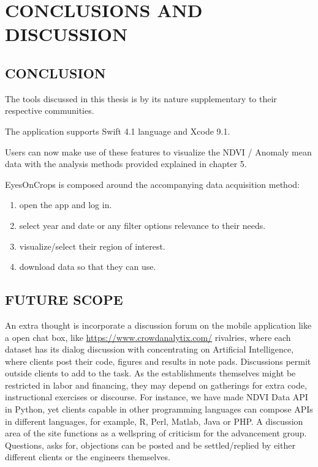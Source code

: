 \chapter{CONCLUSIONS AND DISCUSSION}
\label{chap:conclusion}

\section{CONCLUSION}



The tools discussed in this thesis is by its nature supplementary to their respective communities.

The application supports Swift 4.1 language and Xcode 9.1.

Users can now make use of these features to visualize the NDVI / Anomaly mean data with the analysis methods provided explained in chapter 5. 

EyesOnCrops is composed around the accompanying data acquisition method:
\begin{enumerate}
  \item open the app and log in. 
  \item select year and date or any filter options relevance to their needs.
  \item visualize/select their region of interest.
  \item download data so that they can use.
\end{enumerate}

\section{FUTURE SCOPE}

An extra thought is incorporate a discussion forum on the mobile application like a open chat box, like \url{https://www.crowdanalytix.com/} rivalries, where each dataset has its dialog discussion with concentrating on Artificial Intelligence, where clients post their code, figures and results in note pads. Discussions permit outside clients to add to the task. As the establishments themselves might be restricted in labor and financing, they may depend on gatherings for extra code, instructional exercises or discourse. For instance, we have made NDVI Data API in Python, yet clients capable in other programming languages can compose APIs in different languages, for example, R, Perl, Matlab, Java or PHP. A discussion area of the site functions as a wellspring of criticism for the advancement group. Questions, asks for, objections can be posted and be settled/replied by either different clients or the engineers themselves. \\

